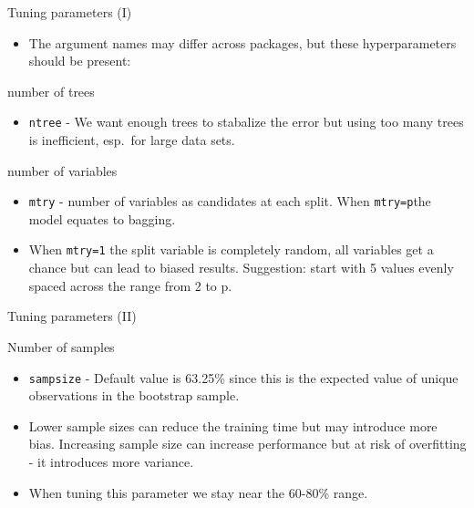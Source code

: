 \documentclass[
  10pt,
  ignorenonframetext,
]{beamer}
\providecommand{\tightlist}{%
  \setlength{\itemsep}{0pt}\setlength{\parskip}{0pt}}
\begin{document}
\begin{frame}[fragile]{Tuning parameters (I)}
\protect\hypertarget{tuning-parameters-i}{}

\begin{itemize}
\tightlist
\item
  The argument names may differ across packages, but these
  hyperparameters should be present:
\end{itemize}

\begin{block}{number of trees}

\begin{itemize}
\tightlist
\item
  \texttt{ntree} - We want enough trees to stabalize the error but using
  too many trees is inefficient, esp.~for large data sets.
\end{itemize}

\end{block}

\begin{block}{number of variables}

\begin{itemize}
\tightlist
\item
  \texttt{mtry} - number of variables as candidates at each split. When
  \texttt{mtry=p}the model equates to bagging.
\item
  When \texttt{mtry=1} the split variable is completely random, all
  variables get a chance but can lead to biased results. Suggestion:
  start with 5 values evenly spaced across the range from 2 to p.
\end{itemize}

\end{block}

\end{frame}

\begin{frame}[fragile]{Tuning parameters (II)}
\protect\hypertarget{tuning-parameters-ii}{}

\begin{block}{Number of samples}

\begin{itemize}
\tightlist
\item
  \texttt{sampsize} - Default value is 63.25\% since this is the
  expected value of unique observations in the bootstrap sample.
\item
  Lower sample sizes can reduce the training time but may introduce more
  bias. Increasing sample size can increase performance but at risk of
  overfitting - it introduces more variance.
\item
  When tuning this parameter we stay near the 60-80\% range.
\end{itemize}

\end{block}

\end{frame}
\end{document}
